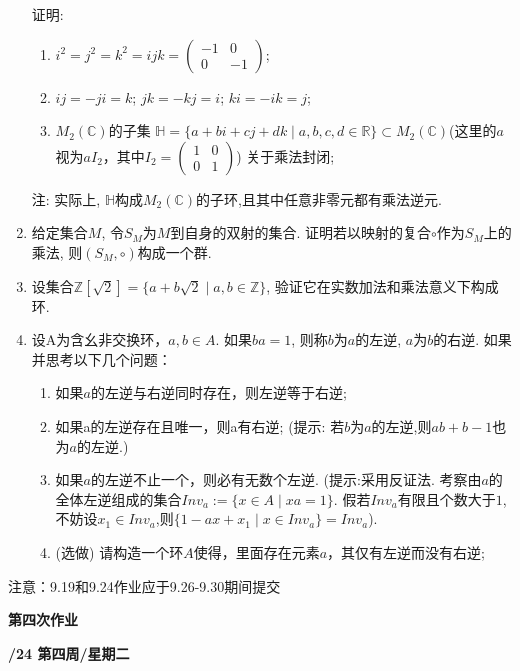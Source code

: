 \documentclass[a4paper,12pt]{article}
\begin{document}
\begin{enumerate}
 证明:
 \begin{enumerate}
 \item $i^2=j^2=k^2=ijk=\begin{pmatrix}-1&0\\0&-1\end{pmatrix}$;
 \item $ij=-ji=k$; $jk=-kj=i$; $ki=-ik=j$;
 \item $M_2(\mathbb C)$的子集 $\mathbb H =\{a+bi+cj+dk\mid a,b,c,d \in \mathbb R\}\subset M_2(\mathbb C)$(这里的$a$视为$aI_2$，其中$I_2=\begin{pmatrix}
     1 & 0\\
     0 & 1
 \end{pmatrix}$) 关于乘法封闭;
 \end{enumerate}
 注: 实际上, $\mathbb H$构成$M_2(\mathbb C)$的子环,且其中任意非零元都有乘法逆元. 
 \item 给定集合$M$, 令$S_M$为$M$到自身的双射的集合. 证明若以映射的复合$\circ$作为$S_M$上的乘法, 则$\left(S_M,\circ\right)$构成一个群.
 \item 设集合$\mathbb{Z}[\sqrt{2}]=\{a+b\sqrt{2}\mid a,b\in\mathbb{Z}\}$, 验证它在实数加法和乘法意义下构成环.
 \item 设A为含幺非交换环，$a,b\in A$. 如果$ba=1$, 则称$b$为$a$的左逆, $a$为$b$的右逆. 如果并思考以下几个问题：
 \begin{enumerate}
     \item 如果$a$的左逆与右逆同时存在，则左逆等于右逆;
     \item 如果a的左逆存在且唯一，则a有右逆; (提示: 若$b$为$a$的左逆,则$ab+b-1$也为$a$的左逆.)
     \item 如果$a$的左逆不止一个，则必有无数个左逆. (提示:采用反证法. 考察由$a$的全体左逆组成的集合$Inv_a:=\{x\in A\mid xa=1\}$. 假若$Inv_a$有限且个数大于$1$,不妨设$x_1\in Inv_a$,则$\{1-ax+x_1\mid x\in Inv_a\}=Inv_a$). 
     \item {\color{red} (选做)} 请构造一个环$A$使得，里面存在元素$a$，其仅有左逆而没有右逆;
 \end{enumerate}
 \end{enumerate}

 {\color{red} 注意：9.19和9.24作业应于9.26-9.30期间提交}

 \newpage
 \head

 \begin{center} %
	{\Large \bf 第四次作业} %
	\vspace{2mm}
	
	{\bf{}/24 \quad  第四周/星期二} %

\end{center} 
\end{document}

